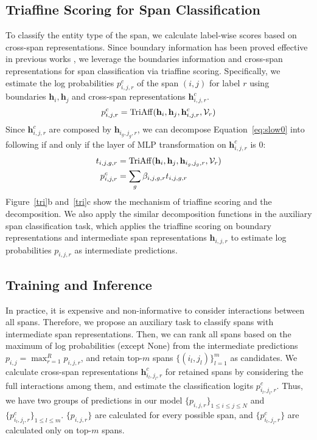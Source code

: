 \documentclass[11pt]{article}
\begin{document}
\subsection{Triaffine Scoring for Span Classification}
To classify the entity type of the span, we calculate label-wise scores based on cross-span representations.
Since boundary information has been proved effective in previous works \cite{yu2020named,fu2021nested}, 
we leverage the boundaries information and cross-span representations for span classification via triaffine scoring. 
Specifically, we estimate the log probabilities $p_{i,j,r}^c$ of the span $(i,j)$ for label $r$ using boundaries $\mathbf{h}_{i},\mathbf{h}_{j}$ and cross-span representations $\mathbf{h}^c_{i,j,r}$.
\begin{equation}
    p_{i,j,r}^c = {\rm TriAff}(\mathbf{h}_i, \mathbf{h}_j, \mathbf{h}^c_{i,j,r}, {\mathcal V}_r)
    \label{eq:slow0}
\end{equation}
Since $\mathbf{h}^c_{i,j,r}$ are composed by $\mathbf{h}_{i_g,j_g,r}$, we can decompose Equation~\ref{eq:slow0} into following if and only if the layer of MLP transformation on $\mathbf{h}^c_{i,j,r}$ is 0:
\begin{align}
    t_{i,j,g,r} &= {\rm TriAff}(\mathbf{h}_{i}, \mathbf{h}_{j}, \mathbf{h}_{i_g,j_g,r}, {\mathcal V}_r) \\
    p^c_{i,j,r} &= \sum_g\beta_{i,j,g,r}t_{i,j,g,r}
\end{align}
Figure~\ref{tri}b and~\ref{tri}c show the mechanism of triaffine scoring and the decomposition. We also apply the similar decomposition functions in the auxiliary span classification task, which applies the triaffine scoring on boundary representations and intermediate span representations $\mathbf{h}_{i,j,r}$ to estimate log probabilities $p_{i,j,r}$ as intermediate predictions.




\subsection{Training and Inference}
\label{s3.6}
In practice, it is expensive and non-informative to consider interactions between all spans. Therefore, we propose an auxiliary task to classify spans with intermediate span representations.
Then, we can rank all spans based on the maximum of log probabilities (except None) from the intermediate predictions $p_{i,j}=\max_{r=1}^Rp_{i,j,r}$, and retain top-$m$ spans $\{(i_l,j_l)\}_{l=1}^m$ as candidates.
We calculate cross-span representations $\mathbf{h}_{i_l,j_l,r}^c$ for retained spans by considering the full interactions among them, and estimate the classification logits $p_{i_l,j_l,r}^c$.
Thus, we have two groups of predictions in our model $\{p_{i,j,r}\}_{1\leq i\leq j \leq N}$ and $\{p^c_{i_l,j_l,r}\}_{1\leq l \leq m}$.
$\{p_{i,j,r}\}$ are calculated for every possible span, and $\{p^{c}_{i_l,j_l,r}\}$ are calculated only on top-$m$ spans.
\end{document}
